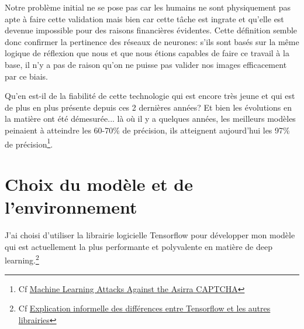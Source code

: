 \documentclass[a4paper,12pt]{report}
\begin{document}
    \medbreak
    Notre problème initial ne se pose pas car les humains ne sont physiquement pas apte à faire cette validation mais bien car cette tâche est ingrate et qu'elle est devenue impossible pour des raisons financières évidentes. Cette définition semble donc confirmer la pertinence des réseaux de neurones: s'ils sont basés sur la même logique de réflexion que nous et que nous étions capables de faire ce travail à la base, il n'y a pas de raison qu'on ne puisse pas valider nos images efficacement par ce biais.
    \bigbreak

    Qu'en est-il de la fiabilité de cette technologie qui est encore très jeune et qui est de plus en plus présente depuis ces 2 dernières années? Et bien les évolutions en la matière ont été démesurée... là où il y a quelques années, les meilleurs modèles peinaient à atteindre les 60-70\% de précision, ils atteignent aujourd'hui les 97\% de précision\footnote{Cf \href{<http://xenon.stanford.edu/~pgolle/papers/dogcat.pdf>}{Machine Learning Attacks Against the Asirra CAPTCHA}}.


    \section{Choix du modèle et de l'environnement}

    J'ai choisi d'utiliser la librairie logicielle Tensorflow pour développer mon modèle qui est actuellement la plus performante et polyvalente en matière de deep learning.\footnote{Cf \href{<https://www.quora.com/Is-TensorFlow-better-than-other-leading-libraries-such-as-Torch-Theano>}{Explication informelle des différences entre Tensorflow et les autres librairies}}
    \medbreak
    \bigbreak
    
\end{document}

